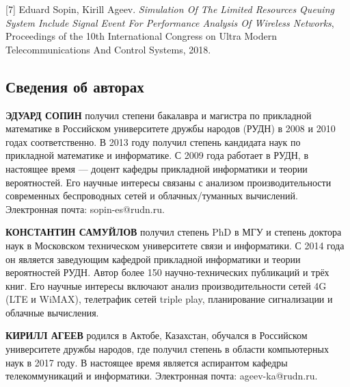 {[}7{]} Eduard Sopin, Kirill Ageev. \emph{Simulation Of The Limited
Resources Queuing System Include Signal Event For Performance Analysis
Of Wireless Networks}, Proceedings of the 10th International Congress on
Ultra Modern Telecommunications And Control Systems, 2018.

\hypertarget{ux441ux432ux435ux434ux435ux43dux438ux44f-ux43eux431-ux430ux432ux442ux43eux440ux430ux445}{%
\subsection{Сведения об
авторах}\label{ux441ux432ux435ux434ux435ux43dux438ux44f-ux43eux431-ux430ux432ux442ux43eux440ux430ux445}}

\textbf{ЭДУАРД СОПИН} получил степени бакалавра и магистра по прикладной
математике в Российском университете дружбы народов (РУДН) в 2008 и 2010
годах соответственно. В 2013 году получил степень кандидата наук по
прикладной математике и информатике. С 2009 года работает в РУДН, в
настоящее время --- доцент кафедры прикладной информатики и теории
вероятностей. Его научные интересы связаны с анализом производительности
современных беспроводных сетей и облачных/туманных вычислений.
Электронная почта: sopin-es@rudn.ru.

\textbf{КОНСТАНТИН САМУЙЛОВ} получил степень PhD в МГУ и степень доктора
наук в Московском техническом университете связи и информатики. С 2014
года он является заведующим кафедрой прикладной информатики и теории
вероятностей РУДН. Автор более 150 научно-технических публикаций и трёх
книг. Его научные интересы включают анализ производительности сетей 4G
(LTE и WiMAX), телетрафик сетей triple play, планирование сигнализации и
облачные вычисления.

\textbf{КИРИЛЛ АГЕЕВ} родился в Актобе, Казахстан, обучался в Российском
университете дружбы народов, где получил степень в области компьютерных
наук в 2017 году. В настоящее время является аспирантом кафедры
телекоммуникаций и информатики. Электронная почта: ageev-ka@rudn.ru.

